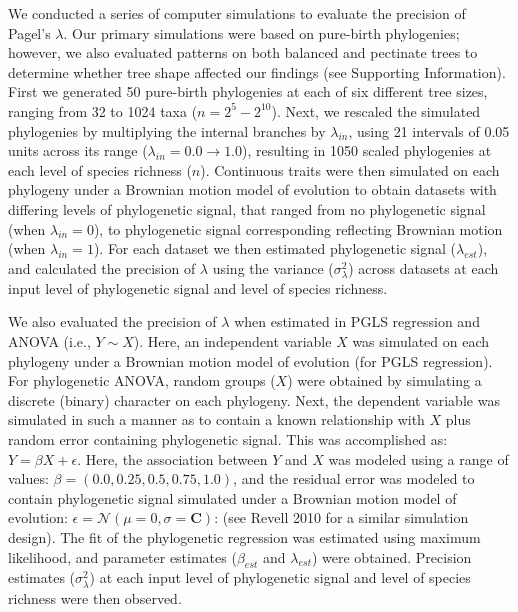 \documentclass[
]{article}
\begin{document}
We conducted a series of computer simulations to evaluate the precision
of Pagel's \(\lambda\). Our primary simulations were based on pure-birth
phylogenies; however, we also evaluated patterns on both balanced and
pectinate trees to determine whether tree shape affected our findings
(see Supporting Information). First we generated 50 pure-birth
phylogenies at each of six different tree sizes, ranging from 32 to 1024
taxa (\(n=2^5 - 2^{10}\)). Next, we rescaled the simulated phylogenies
by multiplying the internal branches by \(\lambda_{in}\), using 21
intervals of 0.05 units across its range
(\(\lambda_{in} = 0.0 \to 1.0\)), resulting in 1050 scaled phylogenies
at each level of species richness (\(n\)). Continuous traits were then
simulated on each phylogeny under a Brownian motion model of evolution
to obtain datasets with differing levels of phylogenetic signal, that
ranged from no phylogenetic signal (when \(\lambda_{in} =0\)), to
phylogenetic signal corresponding reflecting Brownian motion (when
\(\lambda_{in} =1\)). For each dataset we then estimated phylogenetic
signal (\(\lambda_{est}\)), and calculated the precision of \(\lambda\)
using the variance (\(\sigma^2_\lambda\)) across datasets at each input
level of phylogenetic signal and level of species richness. \hfill\break

We also evaluated the precision of \(\lambda\) when estimated in PGLS
regression and ANOVA (i.e., \(Y\sim{X}\)). Here, an independent variable
\(X\) was simulated on each phylogeny under a Brownian motion model of
evolution (for PGLS regression). For phylogenetic ANOVA, random groups
(\(X\)) were obtained by simulating a discrete (binary) character on
each phylogeny. Next, the dependent variable was simulated in such a
manner as to contain a known relationship with \(X\) plus random error
containing phylogenetic signal. This was accomplished as:
\(Y=\beta{X}+\epsilon\). Here, the association between \(Y\) and \(X\)
was modeled using a range of values:
\(\beta=(0.0,0.25, 0.5, 0.75,1.0)\), and the residual error was modeled
to contain phylogenetic signal simulated under a Brownian motion model
of evolution: \(\epsilon=\mathcal{N}(\mu=0,\sigma=\mathbf{C})\): (see
Revell 2010 for a similar simulation design). The fit of the
phylogenetic regression was estimated using maximum likelihood, and
parameter estimates (\(\beta_{est}\) and \(\lambda_{est}\)) were
obtained. Precision estimates (\(\sigma^2_\lambda\)) at each input level
of phylogenetic signal and level of species richness were then observed.
\hfill\break
\end{document}
